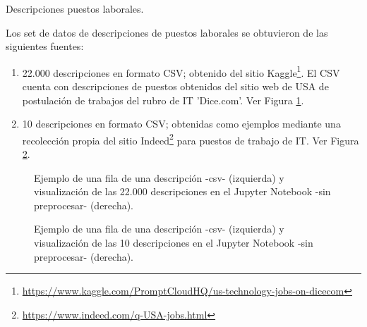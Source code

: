 \documentclass[12pt,a4paper]{article}
\makeatletter
\renewcommand\paragraph{\@startsection{paragraph}{4}{\z@}
            {-2.5ex\@plus -1ex \@minus -.25ex}
            {1.25ex \@plus .25ex}
            {\normalfont\normalsize\bfseries}}
\makeatother
\begin{document}
\begin{sloppypar}
\cleardoublepage

\paragraph{Descripciones puestos laborales.}\label{puestos_lab}

Los set de datos de descripciones de puestos laborales se obtuvieron de las siguientes fuentes:

\begin{enumerate}
\item 22.000 descripciones en formato CSV; obtenido del sitio Kaggle\footnote{\url{https://www.kaggle.com/PromptCloudHQ/us-technology-jobs-on-dicecom}}. El CSV cuenta con descripciones de puestos obtenidos del sitio web de USA de postulación de trabajos del rubro de IT 'Dice.com'. Ver Figura \ref{fig:DS_Job_1}.
\item 10 descripciones en formato CSV; obtenidas como ejemplos mediante una recolección propia del sitio Indeed\footnote{\url{https://www.indeed.com/q-USA-jobs.html}} para puestos de trabajo de IT. Ver Figura \ref{fig:DS_Job_2}.
\end{enumerate}

\begin{figure}[H] 
 \centering
 \noindent{}
 \caption{Ejemplo de una fila de una descripción -csv- (izquierda) y visualización de las 22.000 descripciones en el Jupyter Notebook -sin preprocesar- (derecha).} 
 \label{fig:DS_Job_1}
\end{figure}

\begin{figure}[H] 
 \centering
 \noindent{}
 \caption{Ejemplo de una fila de una descripción -csv- (izquierda) y visualización de las 10 descripciones en el Jupyter Notebook -sin preprocesar- (derecha).} 
 \label{fig:DS_Job_2}
\end{figure}


\end{sloppypar}
\end{document}

